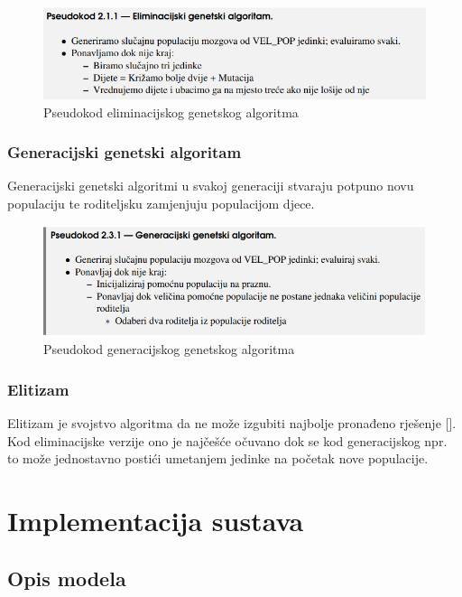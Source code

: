 \documentclass[times, utf8, zavrsni]{fer}
\begin{document}
\begin{figure}[!htb]
	\centering
	\includegraphics[width=15cm]{slike/elimGenAlg.png}
	\caption{Pseudokod eliminacijskog genetskog algoritma}
	\label{fig:elim-gen-alg}
\end{figure}

\subsection{Generacijski genetski algoritam}

Generacijski genetski algoritmi u svakoj generaciji stvaraju potpuno novu populaciju te roditeljsku zamjenjuju populacijom djece. 


\begin{figure}[!htb]
	\centering
	\includegraphics[width=15cm]{slike/genGenAlg.png}
	\caption{Pseudokod generacijskog genetskog algoritma}
	\label{fig:gen-gen-alg}
\end{figure}

\subsection{Elitizam}
\label{elitizam}

Elitizam je svojstvo algoritma da ne može izgubiti najbolje pronađeno rješenje [\citep{UI}]. Kod eliminacijske verzije ono je najčešće očuvano dok se kod generacijskog npr. to može jednostavno postići umetanjem jedinke na početak nove populacije.


\chapter{Implementacija sustava}

\section{Opis modela}
\end{document}
